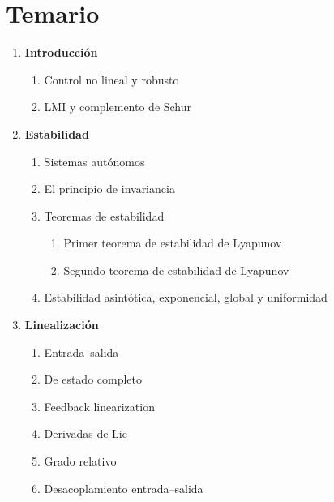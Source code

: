 \section*{Temario}

\begin{enumerate}[label=\arabic*.,leftmargin=*]
    \item \textbf{Introducción}
    \begin{enumerate}[label*=\arabic*.,leftmargin=*]
        \item Control no lineal y robusto
        \item LMI y complemento de Schur
    \end{enumerate}

    \item \textbf{Estabilidad}
    \begin{enumerate}[label*=\arabic*.,leftmargin=*]
        \item Sistemas autónomos
        \item El principio de invariancia
        \item Teoremas de estabilidad
        \begin{enumerate}[label*=\arabic*.,leftmargin=*]
            \item Primer teorema de estabilidad de Lyapunov
            \item Segundo teorema de estabilidad de Lyapunov
        \end{enumerate}
        \item Estabilidad asintótica, exponencial, global y uniformidad
    \end{enumerate}

    \item \textbf{Linealización}
    \begin{enumerate}[label*=\arabic*.,leftmargin=*]
        \item Entrada--salida
        \item De estado completo
        \item Feedback linearization
        \item Derivadas de Lie
        \item Grado relativo
        \item Desacoplamiento entrada--salida
    \end{enumerate}


\end{enumerate}
